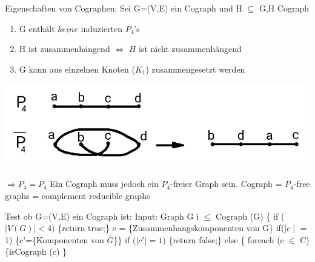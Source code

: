 Eigenschaften von Cographen:
\newline
Sei G=(V,E) ein Cograph und H $\subseteq$ G,H Cograph
\renewcommand{\labelenumi}{\roman{enumi})}
\begin{enumerate}
	\item G enthält $\underline{keine}$ induzierten $P_4$'s
	\item H ist zusammenhängend $\Leftrightarrow$ $\overline{H}$ ist nicht zusammenhängend
	\item G kann aus einzelnen Knoten ($K_1$) zusammengesetzt werden
\end{enumerate}
\begin{center}
	\includegraphics[scale=0.5]{lectures/161202/pix/07.jpg}
\end{center}
$\Rightarrow P_4 = \overline{P_4}$
\newline
Ein Cograph muss jedoch ein $P_4$-freier Graph sein.
\newline
Cograph = $P_4$-free graphs = complement reducible graphs
\par\medskip
Test ob G=(V,E) ein Cograph ist:
\newline
Input: Graph G
\newline
i $\leq$ Cograph (G) \{
\newline
\phantom{}\hspace{1.5cm} if ($\mid V(G)\mid < 4)$ \{return true;\}
\newline
\phantom{}\hspace{1.5cm} c = \{Zusammenhangskomponenten von G\}
\newline
\phantom{}\hspace{1.5cm} if($\mid c \mid $ = 1) \{c'=\{Komponenten von $\overline{G}$\}\}
\newline
\phantom{}\hspace{1.5cm} if ($\mid c'\mid = 1)$ \{return false;\}
\newline
\phantom{}\hspace{1.5cm} else \{
\newline
\phantom{}\hspace{2.5cm} foreach (c $\in$ C)
\newline
\phantom{}\hspace{2.5cm} \{isCograph (c) \}
